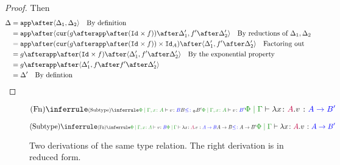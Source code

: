 \begin{framed}
\begin{proof}
            Then 
            \begin{align*}
                \D & = \app\after\pr{\D_1}{\D_2}\qt{By definition}\\
                & = \app\after\pr{\cur {g\after\app\after(\Id{}\times f)}\after\D'_1}{f'\after\D'_2}\qt{By reductions of $\D_1, \D_2$}\\
                & = \app\after(\cur {g\after\app\after(\Id{}\times f)}\times\Id{A})\after\pr{\D'_1}{f'\after\D'_2} \qt{Factoring out}\\
                & = g\after\app\after(\Id{}\times f)\after\pr{\D'_1}{f'\after\D'_2}\qt{By the exponential property}\\
                & = g\after\app\after\pr{\D'_1}{f\after f'\after \D'_2}\\
                & = \D'\qt{By defintion}
            \end{align*}
    \end{proof}
\end{framed}

\begin{figure}[h!]
    \begin{framed}
        \begin{minipage}{0.47\linewidth}
            \begin{equation}
                \ntreeruleI{\vfun}{\scalebox{.65}{$
                    \ntreeruleII{\vsubtype}{
                        \etyperelation{\P}{\gax}{v}{B}
                    }{
                        B \subtypep B'
                    }{
                        \etyperelation{\P}{\gax}{v}{B'}
                    }
                $}}{\gpetyperelation{\lam{x}{A}{v}}{\fntype{A}{B'}}}
            \end{equation}
        \end{minipage}
        \quad
        \begin{minipage}{0.47\linewidth}
            \begin{equation}
                \ntreeruleII{\vsubtype}{
                    \scalebox{.65}{$
                    \ntreeruleI{\vfun}{
                        \etyperelation{\P}{\gax}{v}{B} 
                    }{    
                        \gpetyperelation{\lam{x}{A}{v}}{\fntype{A}{B}}
                    }
                    $}
                }{ 
                    \scalebox{.7}{$\ab \subtype \fntype{A}{B'}$}
                }{
                    \gpetyperelation{\lam{x}{A}{v}}{\fntype{A}{B'}}
                }
            \end{equation}
        \end{minipage}
        
    \end{framed}

    \caption{Two derivations of the same type relation. The right derivation is in reduced form.}
\end{figure}

